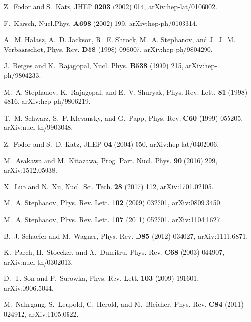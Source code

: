 \documentclass[secnumarabic, graphics,floatfix, nofootinbib,tightenlines,nobibnotes, aps, prl, 12pt]{revtex4-1}
\begin{document}

\begin{thebibliography}{10}

Z.~Fodor and S.~Katz,
\newblock JHEP {\bf 0203} (2002) 014, arXiv:hep-lat/0106002.

F.~Karsch,
\newblock Nucl.Phys. {\bf A698} (2002) 199, arXiv:hep-ph/0103314.

A.~M. Halasz, A.~D. Jackson, R.~E. Shrock, M.~A. Stephanov, and J.~J.~M.
  Verbaarschot,
\newblock Phys. Rev. {\bf D58} (1998) 096007, arXiv:hep-ph/9804290.

J.~Berges and K.~Rajagopal,
\newblock Nucl. Phys. {\bf B538} (1999) 215, arXiv:hep-ph/9804233.

M.~A. Stephanov, K.~Rajagopal, and E.~V. Shuryak,
\newblock Phys. Rev. Lett. {\bf 81} (1998) 4816, arXiv:hep-ph/9806219.

T.~M. Schwarz, S.~P. Klevansky, and G.~Papp,
\newblock Phys. Rev. {\bf C60} (1999) 055205, arXiv:nucl-th/9903048.

Z.~Fodor and S.~D. Katz,
\newblock JHEP {\bf 04} (2004) 050, arXiv:hep-lat/0402006.

M.~Asakawa and M.~Kitazawa,
\newblock Prog. Part. Nucl. Phys. {\bf 90} (2016) 299, arXiv:1512.05038.

X.~Luo and N.~Xu,
\newblock Nucl. Sci. Tech. {\bf 28} (2017) 112, arXiv:1701.02105.

M.~A. Stephanov,
\newblock Phys. Rev. Lett. {\bf 102} (2009) 032301, arXiv:0809.3450.

M.~A. Stephanov,
\newblock Phys. Rev. Lett. {\bf 107} (2011) 052301, arXiv:1104.1627.

B.~J. Schaefer and M.~Wagner,
\newblock Phys. Rev. {\bf D85} (2012) 034027, arXiv:1111.6871.

K.~Paech, H.~Stoecker, and A.~Dumitru,
\newblock Phys. Rev. {\bf C68} (2003) 044907, arXiv:nucl-th/0302013.

D.~T. Son and P.~Surowka,
\newblock Phys. Rev. Lett. {\bf 103} (2009) 191601, arXiv:0906.5044.

M.~Nahrgang, S.~Leupold, C.~Herold, and M.~Bleicher,
\newblock Phys. Rev. {\bf C84} (2011) 024912, arXiv:1105.0622.


\end{thebibliography}
\end{document}
